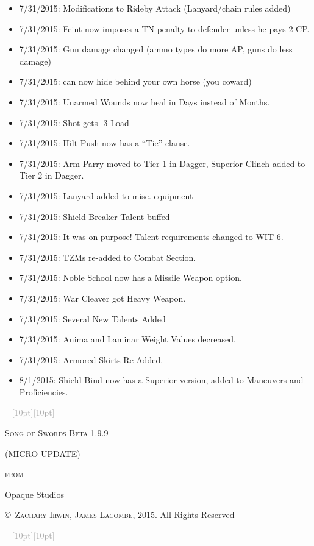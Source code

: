 \documentclass[oneside,11pt,english]{book}
\newcommand{\ornamento}{\vspace{2em}\noindent \textcolor{darkgray}{\hrulefill~ \raisebox{-2.5pt}[10pt][10pt]{\leafright \decofourleft \decothreeleft  \aldineright \decotwo \floweroneleft \decoone   \floweroneright \decotwo \aldineleft\decothreeright \decofourright \leafleft} ~  \hrulefill \linebreak \vspace{2em}}}
\begin{document}
{\begin{itemize}
\item 7/31/2015: Modifications to Rideby Attack (Lanyard/chain rules added) 
\item 7/31/2015: Feint now imposes a TN penalty to defender unless he pays 2 CP. 
\item 7/31/2015: Gun damage changed (ammo types do more AP, guns do less damage) 
\item 7/31/2015: can now hide behind your own horse (you coward) 
\item 7/31/2015: Unarmed Wounds now heal in Days instead of Months. 
\item 7/31/2015: Shot gets -3 Load 
\item 7/31/2015: Hilt Push now has a “Tie” clause. 
\item 7/31/2015: Arm Parry moved to Tier 1 in Dagger, Superior Clinch added to Tier 2 in Dagger. 
\item 7/31/2015: Lanyard added to misc. equipment 
\item 7/31/2015: Shield-Breaker Talent buffed 
\item 7/31/2015: It was on purpose! Talent requirements changed to WIT 6. 
\item 7/31/2015: TZMs re-added to Combat Section. 
\item 7/31/2015: Noble School now has a Missile Weapon option. 
\item 7/31/2015: War Cleaver got Heavy Weapon. 
\item 7/31/2015: Several New Talents Added 
\item 7/31/2015: Anima and Laminar Weight Values decreased. 
\item 7/31/2015: Armored Skirts Re-Added. 
\item 8/1/2015: Shield Bind now has a Superior version, added to Maneuvers and Proficiencies. 
\end{itemize}}
\begin{titlepage}
\pagestyle{empty}
	\centering
	\ornamento\\
	{\scshape\Huge Song of Swords Beta 1.9.9\par}
	\vspace{0.8cm}
	{\scshape\Large{(MICRO UPDATE)}\par \scshape\Large{from} \par}
	\vspace{0.1 cm}
	{\huge Opaque Studios \par}
	\vfill
	\vspace{0.2 cm}
	 \textsc{\copyright~Zachary Irwin, James Lacombe}, 2015. All Rights Reserved
	 
	 
	 \ornamento
\end{titlepage}
\end{document}
